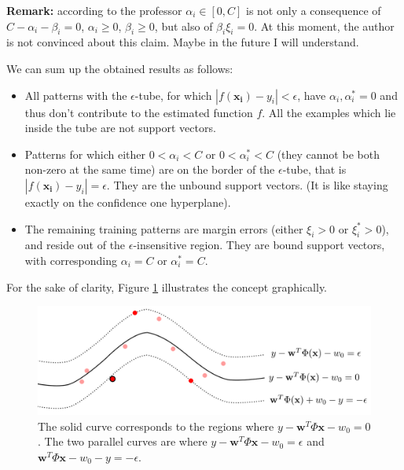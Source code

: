 \textbf{Remark:} according to the professor $\alpha_i \in [0,C]$ is not only a consequence of $C - \alpha_i - \beta_i = 0$, $\alpha_i \geq 0$, $\beta_i \geq 0$, but also of $\beta_i \xi_i = 0$. At this moment, the author is not convinced about this claim. Maybe in the future I will understand. \newline

We can sum up the obtained results as follows:
\begin{itemize}
    \item All patterns with the $\epsilon$-tube, for which $|f(\pmb{x_i})-y_i| < \epsilon$, have $\alpha_i, \alpha_i^* = 0$ and thus don't contribute to the estimated function $f$. All the examples which lie inside the tube are not support vectors.
    
    \item Patterns for which either $0 < \alpha_i < C$ or $0 < \alpha_i^* < C$ (they cannot be both non-zero at the same time) are on the border of the $\epsilon$-tube, that is $|f(\pmb{x_i})-y_i| = \epsilon$. They are the unbound support vectors. (It is like staying exactly on the confidence one hyperplane).
    
    \item The remaining training patterns are margin errors (either $\xi_i > 0$ or $\xi_i^* > 0$), and reside out of the $\epsilon$-insensitive region. They are bound support vectors, with corresponding $\alpha_i = C$ or $\alpha_i^* = C$.
\end{itemize}

For the sake of clarity, Figure \ref{fig:svm_regression_graphically} illustrates the concept graphically.

\begin{figure}[ht]
    \centering
    \includegraphics[width=\textwidth]{images/svm_regression_graphically.png}
    \caption{The solid curve corresponds to the regions where $y - \pmb{w}^T \Phi{\pmb{x}} - w_0 = 0$. The two parallel curves are where $y - \pmb{w}^T \Phi{\pmb{x}} - w_0 = \epsilon$ and $\pmb{w}^T \Phi{\pmb{x}} - w_0 - y = - \epsilon$.}
    \label{fig:svm_regression_graphically}
\end{figure}

